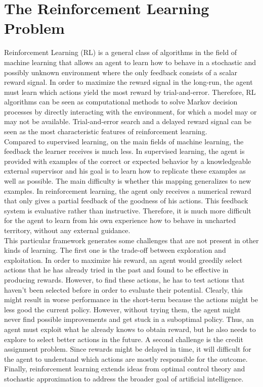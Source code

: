 \section{The Reinforcement Learning Problem}
Reinforcement Learning (RL) is a general class of algorithms in the field of machine learning that allows an agent to learn how to behave in a stochastic and possibly unknown environment where the only feedback consists of a scalar reward signal. In order to maximize the reward signal in the long-run, the agent must learn which actions yield the most reward by trial-and-error. Therefore, RL algorithms can be seen as computational methods to solve Markov decision processes by directly interacting with the environment, for which a model may or may not be available. Trial-and-error search and a delayed reward signal can be seen as the most characteristic features of reinforcement learning.\\
Compared to supervised learning, on the main fields of machine learning, the feedback the learner receives is much less. In supervised learning, the agent is provided with examples of the correct or expected behavior by a knowledgeable external supervisor and his goal is to learn how to replicate these examples as well as possible. The main difficulty is whether this mapping generalizes to new examples. In reinforcement learning, the agent only receives a numerical reward that only gives a partial feedback of the goodness of his actions. This feedback system is evaluative rather than instructive. Therefore, it is much more difficult for the agent to learn from his own experience how to behave in uncharted territory, without any external guidance.\\ 
This particular framework generates some challenges that are not present in other kinds of learning. The first one is the trade-off between exploration and exploitation. In order to maximize his reward, an agent would greedily select actions that he has already tried in the past and found to be effective in producing rewards. However, to find these actions, he has to test actions that haven't been selected before in order to evaluate their potential. Clearly, this might result in worse performance in the short-term because the actions might be less good the current policy. However, without trying them, the agent might never find possible improvements and get stuck in a suboptimal policy. Thus, an agent must exploit what he already knows to obtain reward, but he also needs to explore to select better actions in the future. A second challenge is the credit assignment problem. Since rewards might be delayed in time, it will difficult for the agent to understand which actions are mostly responsible for the outcome. Finally, reinforcement learning extends ideas from optimal control theory and stochastic approximation to address the broader goal of artificial intelligence. 

